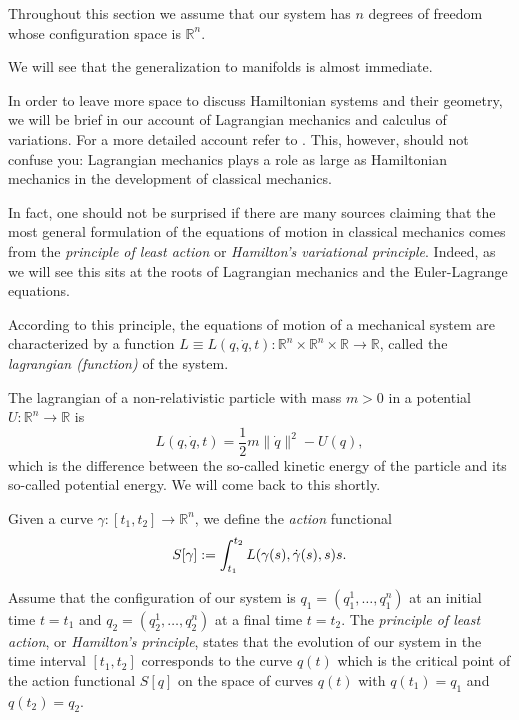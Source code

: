 \documentclass[english,fontsize=11pt,paper=a5,oneside]{scrbook}
\newcommand{\R}{\mathbb{R}}
\let\d\relax
\newcommand{\d}{\mathrm{d}}
\theoremstyle{definition}
\newenvironment{example}
  {\pushQED{\qed}\renewcommand{\qedsymbol}{$\lozenge$}\examplex}
  {\popQED\endexamplex}
\begin{document}
\begin{tcolorbox}
  Throughout this section we assume that our system has $n$ degrees of freedom whose configuration space is $\R^n$.
\end{tcolorbox}
We will see that the generalization to manifolds is almost immediate.

In order to leave more space to discuss Hamiltonian systems and their geometry, we will be brief in our account of Lagrangian mechanics and calculus of variations. For a more detailed account refer to \cite[Part II]{book:arnold}.
This, however, should not confuse you: Lagrangian mechanics plays a role as large as Hamiltonian mechanics in the development of classical mechanics.

In fact, one should not be surprised if there are many sources claiming that the most general formulation of the equations of motion in classical mechanics comes from the \emph{principle of least action} or \emph{Hamilton's variational principle}. Indeed, as we will see this sits at the roots of Lagrangian mechanics and the Euler-Lagrange equations.

According to this principle, the equations of motion of a mechanical system are characterized by a function $L \equiv L(q, \dot q, t) : \R^n \times \R^n \times \R \to \R$, called the \emph{lagrangian (function)} of the system.

\begin{example}
  The lagrangian of a non-relativistic particle with mass $m > 0$ in a potential $U : \R^n \to \R$ is
  \begin{equation}
    L(q, \dot q, t) = \frac12 m \|\dot q\|^2 - U(q),
  \end{equation}
  which is the difference between the so-called kinetic energy of the particle and its so-called potential energy.
  We will come back to this shortly.
\end{example}

Given a curve $\gamma:[t_1, t_2] \to \R^n$, we define the \emph{action} functional
\begin{equation}\label{eq:Laction}
  S[\gamma] := \int_{t_1}^{t_2} L(\gamma(s), \dot \gamma(s), s) \d s.
\end{equation}

\begin{tcolorbox}
  Assume that the configuration of our system is $q_1 = (q_1^1, \ldots, q_1^n)$ at an initial time $t=t_1$ and $q_2 = (q_2^1, \ldots, q_2^n)$ at a final time $t = t_2$. The \emph{principle of least action}, or \emph{Hamilton's principle}, states that the evolution of our system in the time interval $[t_1, t_2]$ corresponds to the curve $q(t)$ which is the critical point of the action functional $S[q]$ on the space of curves $q(t)$ with $q(t_1) = q_1$ and $q(t_2) = q_2$.
\end{tcolorbox}
\end{document}
